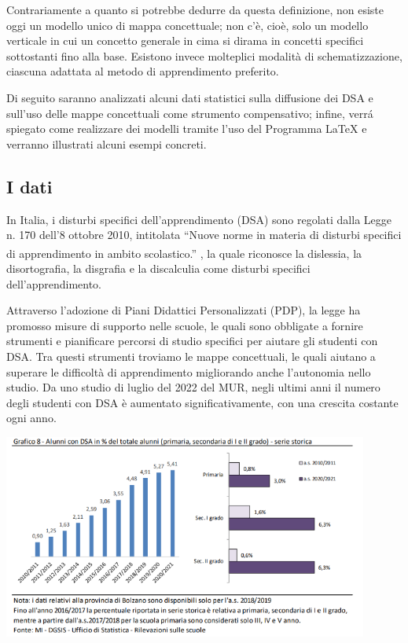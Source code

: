 \documentclass[portrait,a4paper]{article} %
\begin{document}
Contrariamente a quanto si potrebbe dedurre da questa definizione, non esiste oggi un modello unico di mappa concettuale; non c'è, cioè, solo un modello verticale in cui un concetto generale in cima si dirama in concetti specifici sottostanti fino alla base. Esistono invece molteplici modalità di schematizzazione, ciascuna adattata al metodo di apprendimento preferito.
\par
Di seguito saranno analizzati alcuni dati statistici sulla diffusione dei DSA e sull’uso delle mappe concettuali come strumento compensativo; infine, verrá spiegato come realizzare dei modelli tramite l’uso del Programma LaTeX e verranno illustrati alcuni esempi concreti.
\subsection{I dati}
In Italia, i disturbi specifici dell’apprendimento (DSA) sono regolati dalla Legge n. 170 dell’8 ottobre 2010, intitolata “Nuove norme in materia di disturbi specifici di apprendimento in ambito scolastico.” \textsuperscript{\cite{L170}}, la quale riconosce la dislessia, la disortografia, la disgrafia e la discalculia come disturbi specifici dell’apprendimento.
\par
Attraverso l’adozione di Piani Didattici Personalizzati (PDP), la legge ha promosso misure di supporto nelle scuole, le quali sono obbligate a fornire strumenti e pianificare percorsi di studio specifici per aiutare gli studenti con DSA. Tra questi strumenti troviamo le mappe concettuali, le quali aiutano a superare le difficoltà di apprendimento migliorando anche l’autonomia nello studio. Da uno studio di luglio del 2022 del MUR, negli ultimi anni il numero degli studenti con DSA è aumentato significativamente, con una crescita costante ogni anno.
\par
\includegraphics[width=0.9\textwidth]{img/statistica_italia.png}
\par
\end{document}
